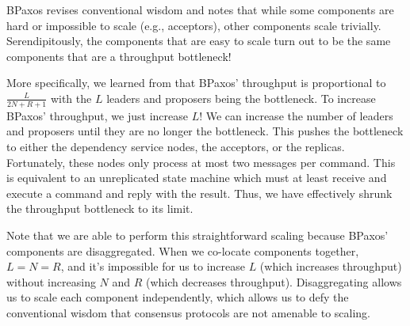 BPaxos revises conventional wisdom and notes that while some components are
hard or impossible to scale (e.g., acceptors), other components scale
trivially. Serendipitously, the components that are easy to scale turn out to
be the same components that are a throughput bottleneck!

More specifically, we learned from  that BPaxos'
throughput is proportional to $\frac{L}{2N+R+1}$ with the $L$ leaders and
proposers being the bottleneck. To increase BPaxos' throughput, we just
increase $L$! We can increase the number of leaders and proposers until they
are no longer the bottleneck. This pushes the bottleneck to either the
dependency service nodes, the acceptors, or the replicas. Fortunately, these
nodes only process at most two messages per command. This is equivalent to an
unreplicated state machine which must at least receive and execute a command
and reply with the result. Thus, we have effectively shrunk the throughput
bottleneck to its limit.

Note that we are able to perform this straightforward scaling because BPaxos'
components are disaggregated. When we co-locate components together, $L=N=R$,
and it's impossible for us to increase $L$ (which increases throughput) without
increasing $N$ and $R$ (which decreases throughput). Disaggregating allows us
to scale each component independently, which allows us to defy the conventional
wisdom that consensus protocols are not amenable to scaling.
